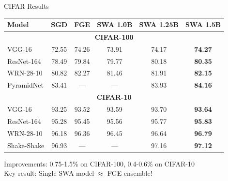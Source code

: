 \documentclass{beamer}
\begin{document}
\begin{frame}{CIFAR Results}

\begin{table}
\centering
\small
\begin{tabular}{lccccc}
\toprule
\textbf{Model} & \textbf{SGD} & \textbf{FGE} & \textbf{SWA 1.0B} & \textbf{SWA 1.25B} & \textbf{SWA 1.5B} \\
\midrule
\multicolumn{6}{c}{\textbf{CIFAR-100}} \\
\midrule
VGG-16 & 72.55 & 74.26 & 73.91 & 74.17 & \textbf{74.27} \\
ResNet-164 & 78.49 & 79.84 & 79.77 & 80.18 & \textbf{80.35} \\
WRN-28-10 & 80.82 & 82.27 & 81.46 & 81.91 & \textbf{82.15} \\
PyramidNet & 83.41 & — & — & 83.93 & \textbf{84.16} \\
\midrule
\multicolumn{6}{c}{\textbf{CIFAR-10}} \\
\midrule
VGG-16 & 93.25 & 93.52 & 93.59 & 93.70 & \textbf{93.64} \\
ResNet-164 & 95.28 & 95.45 & 95.56 & 95.77 & \textbf{95.83} \\
WRN-28-10 & 96.18 & 96.36 & 96.45 & 96.64 & \textbf{96.79} \\
Shake-Shake & 96.93 & — & — & 97.16 & \textbf{97.12} \\
\bottomrule
\end{tabular}
\end{table}

\vspace{0.3cm}

Improvements: 0.75-1.5\% on CIFAR-100, 0.4-0.6\% on CIFAR-10\\
Key result: Single SWA model $\approx$ FGE ensemble!

\end{frame}
\end{document}
